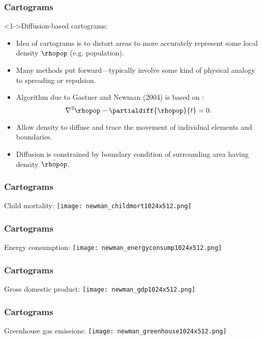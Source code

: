 \begin{frame}
  \frametitle{Cartograms}

  \begin{block}<1->{Diffusion-based cartograms:}
    \begin{itemize}
    \item<2-> Idea of cartograms is to \alert{distort areas} to 
      more accurately represent
      some local density $\rhopop$ (e.g. population).
    \item<3-> Many methods put forward---typically involve
      some kind of physical analogy to \alert{spreading or repulsion}.
    \item<4-> Algorithm due to Gastner and Newman (2004)\cite{gastner2004a}
      is based on :
      $$ 
      \nabla^2 \rhopop - \partialdiff{\rhopop}{t} = 0. 
      $$
    \item<5-> Allow density to diffuse and trace the 
      movement of individual elements and boundaries.
    \item<6-> Diffusion is constrained by boundary condition
      of surrounding area having density $\bar{\rhopop}$.
    \end{itemize}
  \end{block}

\end{frame}

\begin{frame}
  \frametitle{Cartograms}

  Child mortality:
  \texttt{[image: newman\_childmort1024x512.png]}

\end{frame}

\begin{frame}
  \frametitle{Cartograms}

  Energy consumption:
  \texttt{[image: newman\_energyconsump1024x512.png]}
\end{frame}

\begin{frame}
  \frametitle{Cartograms}

  Gross domestic product:
  \texttt{[image: newman\_gdp1024x512.png]}
\end{frame}

\begin{frame}
  \frametitle{Cartograms}

  Greenhouse gas emissions:
  \texttt{[image: newman\_greenhouse1024x512.png]}
\end{frame}

